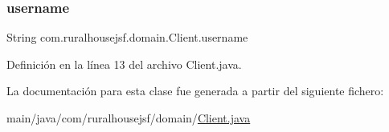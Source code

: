 \mbox{\label{classcom_1_1ruralhousejsf_1_1domain_1_1_client_a0d105bbb8e72c4a5b70ec43f59227882}} 
\subsubsection{\texorpdfstring{username}{username}}
{\footnotesize\ttfamily String com.\+ruralhousejsf.\+domain.\+Client.\+username\hspace{0.3cm}{\ttfamily [private]}}



Definición en la línea 13 del archivo Client.\+java.



La documentación para esta clase fue generada a partir del siguiente fichero\+:\begin{DoxyCompactItemize}
\item 
main/java/com/ruralhousejsf/domain/\mbox{\hyperlink{_client_8java}{Client.\+java}}\end{DoxyCompactItemize}
